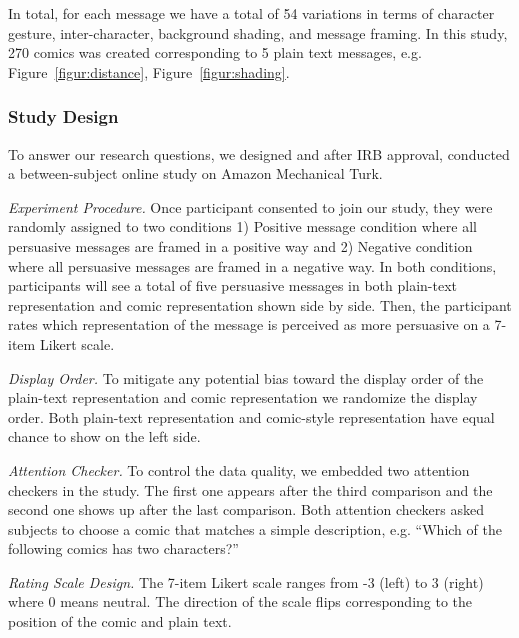 In total, for each message we have a total of 54 variations in terms of character gesture, inter-character, background shading, and message framing. In this study, 270 comics was created corresponding to 5 plain text messages, e.g. Figure~\ref{figur:distance}, Figure~\ref{figur:shading}.

\subsubsection{Study Design}
To answer our research questions, we designed and after IRB approval, conducted a between-subject online study on Amazon Mechanical Turk.

\textit{Experiment Procedure.} Once participant consented to join our study, they were randomly assigned to two conditions 1) Positive message condition where all persuasive messages are framed in a positive way and 2) Negative condition where all persuasive messages are framed in a negative way. In both conditions, participants will see a total of five persuasive messages in both plain-text representation and comic representation shown side by side. Then, the participant rates which representation of the message is perceived as more persuasive on a 7-item Likert scale.

\textit{Display Order.} To mitigate any potential bias toward the display order of the plain-text representation and comic representation we randomize the display order. Both plain-text representation and comic-style representation have equal chance to show on the left side.

\textit{Attention Checker.} To control the data quality, we embedded two attention checkers in the study. The first one appears after the third comparison and the second one shows up after the last comparison. Both attention checkers asked subjects to choose a comic that matches a simple description, e.g. ``Which of the following comics has two characters?''

\textit{Rating Scale Design.} The 7-item Likert scale ranges from -3 (left) to 3 (right) where 0 means neutral. The direction of the scale flips corresponding to the position of the comic and plain text.

